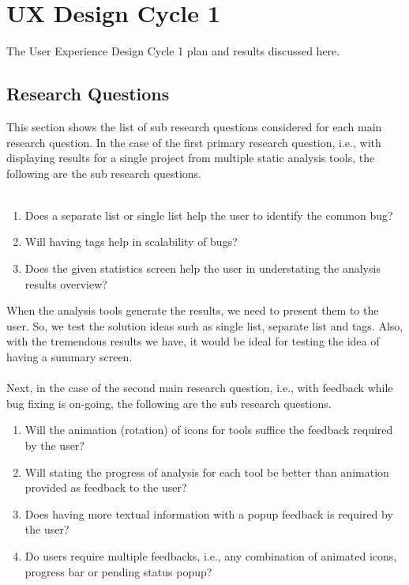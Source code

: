 \chapter{UX Design Cycle 1}
\label{ch:ux1-cycle_report}

The User Experience Design Cycle 1 plan and results discussed here.

\section{Research Questions}

This section shows the list of sub research questions considered for each main research question. In the case of the first primary research question, i.e., with displaying results for a single project from multiple static analysis tools, the following are the sub research questions. \\ \\

\begin{enumerate}
\item Does a separate list or single list help the user to identify the common bug?
\item Will having tags help in scalability of bugs?
\item Does the given statistics screen help the user in understating the analysis results overview? \\
\end{enumerate}

When the analysis tools generate the results, we need to present them to the user. So, we test the solution ideas such as single list, separate list and tags. Also, with the tremendous results we have, it would be ideal for testing the idea of having a summary screen. \\ \\

Next, in the case of the second main research question, i.e., with feedback while bug fixing is on-going, the following are the sub research questions. \\

\begin{enumerate}
\item Will the animation (rotation) of icons for tools suffice the feedback required by the user?
\item Will stating the progress of analysis for each tool be better than animation provided as feedback to the user?
\item Does having more textual information with a popup feedback is required by the user?
\item Do users require multiple feedbacks, i.e., any combination of animated icons, progress bar or pending status popup? \\
\end{enumerate}

